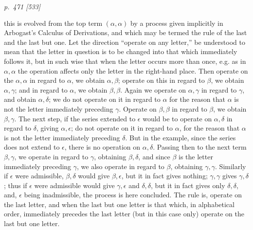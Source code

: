 \documentclass[11pt,a4paper]{article}
\theoremstyle{plain}
\theoremstyle{definition}
\newcommand{\eps}{\epsilon}
\begin{document}
\clearpage

\bigskip
\textit{p.~471 [533]}
\smallskip

\noindent

this is evolved from the top term \((\alpha,\alpha)\) by a process given implicitly in
Arbogast's Calculus of Derivations, and which may be termed the rule of the last and the last
but one. Let the direction ``operate on any letter,'' be understood to mean that the letter
in question is to be changed into that which immediately follows it, but in such wise that
when the letter occurs more than once, e.g. as in \(\alpha,\alpha\) the operation affects
only the letter in the right-hand place. Then operate on the \(\alpha,\alpha\) in regard to
\(\alpha\), we obtain \(\alpha,\beta\); operate on this in regard to \(\beta\), we obtain
\(\alpha,\gamma\); and in regard to \(\alpha\), we obtain \(\beta,\beta\). Again we operate
on \(\alpha,\gamma\) in regard to \(\gamma\), and obtain \(\alpha,\delta\); we do not operate
on it in regard to \(\alpha\) for the reason that \(\alpha\) is not the letter immediately
preceding \(\gamma\). Operate on \(\beta,\beta\) in regard to \(\beta\), we obtain
\(\beta,\gamma\). The next step, if the series extended to \(\eps\) would be to operate on
\(\alpha,\delta\) in regard to \(\delta\), giving \(\alpha,\eps\); do not operate on it in
regard to \(\alpha\), for the reason that \(\alpha\) is not the letter immediately preceding
\(\delta\). But in the example, since the series does not extend to \(\eps\), there is no
operation on \(\alpha,\delta\). Passing then to the next term \(\beta,\gamma\), we operate
in regard to \(\gamma\), obtaining \(\beta,\delta\), and since \(\beta\) is the letter
immediately preceding \(\gamma\), we also operate in regard to \(\beta\), obtaining
\(\gamma,\gamma\). Similarly if \(\eps\) were admissible, \(\beta,\delta\) would give
\(\beta,\eps\), but it in fact gives nothing; \(\gamma,\gamma\) gives \(\gamma,\delta\);
thus if \(\eps\) were admissible would give \(\gamma,\eps\) and \(\delta,\delta\), but it in
fact gives only \(\delta,\delta\), and, \(\eps\) being inadmissible, the process is here
concluded. The rule is, operate on the last letter, and when the last but one letter is that
which, in alphabetical order, immediately precedes the last letter (but in this case only)
operate on the last but one letter.
\end{document}
